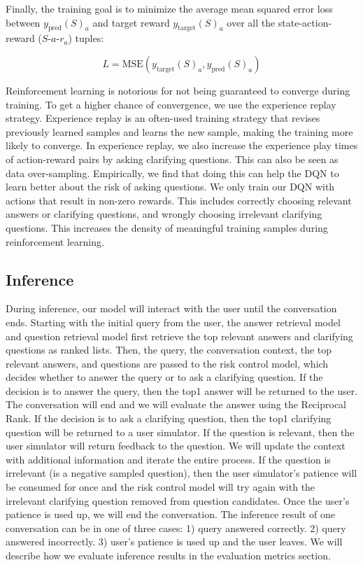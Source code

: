 \documentclass[format=acmsmall, review=False, screen=true]{acmart}
\begin{document}
Finally, the training goal is to minimize the average mean squared error loss between $y_{\text{pred}}(S)_{a}$ and target reward $y_{\text{target}}(S)_{a}$ over all the state-action-reward ($S$-$a$-$r_a$) tuples: 

\begin{equation}
L = \text{MSE}(y_{\text{target}}(S)_{a}, y_{\text{pred}}(S)_{a})
\end{equation}

 
Reinforcement learning is notorious for not being guaranteed to converge during training. To get a higher chance of convergence, we use the experience replay strategy. Experience replay is an often-used training strategy that revises previously learned samples and learns the new sample, making the training more likely to converge. In experience replay, we also increase the experience play times of action-reward pairs by asking clarifying questions. This can also be seen as data over-sampling. Empirically, we find that doing this can help the DQN to learn better about the risk of asking questions. We only train our DQN with actions that result in non-zero rewards. This includes correctly choosing relevant answers or clarifying questions, and wrongly choosing irrelevant clarifying questions. This increases the density of meaningful training samples during reinforcement learning.


\subsection{Inference}
During inference, our model will interact with the user until the conversation ends. Starting with the initial query from the user, the answer retrieval model and question retrieval model first retrieve the top relevant answers and clarifying questions as ranked lists. Then, the query, the conversation context, the top relevant answers, and questions are passed to the risk control model, which decides whether to answer the query or to ask a clarifying question. If the decision is to answer the query, then the top1 answer will be returned to the user. The conversation will end and we will evaluate the answer using the Reciprocal Rank. If the decision is to ask a clarifying question, then the top1 clarifying question will be returned to a user simulator. If the question is relevant, then the user simulator will return feedback to the question. We will update the context with additional information and iterate the entire process. If the question is irrelevant (is a negative sampled question), then the user simulator's patience will be consumed for once and the risk control model will try again with the irrelevant clarifying question removed from question candidates. Once the user's patience is used up, we will end the conversation. The inference result of one conversation can be in one of three cases: 1) query answered correctly. 2) query answered incorrectly. 3) user's patience is used up and the user leaves. We will describe how we evaluate inference results in the evaluation metrics section.
\end{document}
